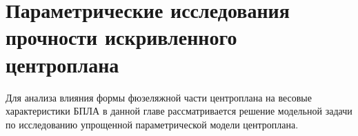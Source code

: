 \chapter{Параметрические исследования прочности искривленного центроплана}
\label{chap:Kesson}

Для анализа влияния формы фюзеляжной части центроплана на весовые характеристики БПЛА в данной главе рассматривается решение модельной задачи по исследованию упрощенной параметрической модели центроплана. 

%
